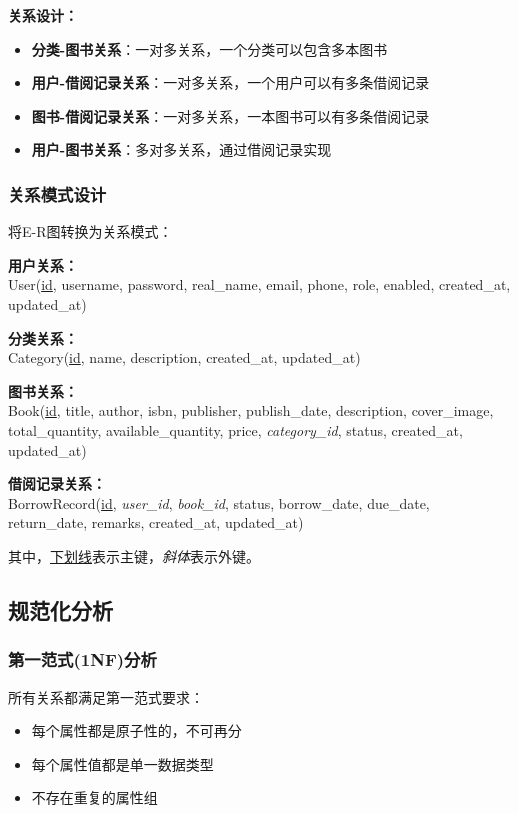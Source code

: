 \documentclass[12pt,a4paper]{article}
\begin{document}
\textbf{关系设计：}
\begin{itemize}
    \item \textbf{分类-图书关系}：一对多关系，一个分类可以包含多本图书
    \item \textbf{用户-借阅记录关系}：一对多关系，一个用户可以有多条借阅记录
    \item \textbf{图书-借阅记录关系}：一对多关系，一本图书可以有多条借阅记录
    \item \textbf{用户-图书关系}：多对多关系，通过借阅记录实现
\end{itemize}

\subsubsection{关系模式设计}
将E-R图转换为关系模式：

\textbf{用户关系：}\\
User(\underline{id}, username, password, real\_name, email, phone, role, enabled, created\_at, updated\_at)

\textbf{分类关系：}\\
Category(\underline{id}, name, description, created\_at, updated\_at)

\textbf{图书关系：}\\
Book(\underline{id}, title, author, isbn, publisher, publish\_date, description, cover\_image, total\_quantity, available\_quantity, price, \textit{category\_id}, status, created\_at, updated\_at)

\textbf{借阅记录关系：}\\
BorrowRecord(\underline{id}, \textit{user\_id}, \textit{book\_id}, status, borrow\_date, due\_date, return\_date, remarks, created\_at, updated\_at)

其中，\underline{下划线}表示主键，\textit{斜体}表示外键。

\subsection{规范化分析}

\subsubsection{第一范式(1NF)分析}
所有关系都满足第一范式要求：
\begin{itemize}
    \item 每个属性都是原子性的，不可再分
    \item 每个属性值都是单一数据类型
    \item 不存在重复的属性组
\end{itemize}
\end{document}
